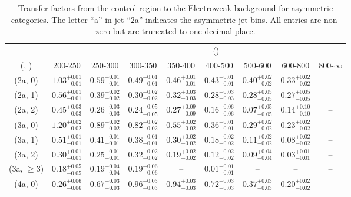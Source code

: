 \begin{table}[h!]
\tiny
\centering
\caption{Transfer factors from the \mj control region to the Electroweak background for asymmetric categories. The letter ``a'' in jet \eg ``2a''  indicates the asymmetric jet bins. All entries are non-zero but are truncated to one decimal place.\label{tab:tf_mu_total_asym}}
\begin{tabular}
{ccccccccc}
	\hline\hline
&	& \multicolumn{8}{c}{\scalht (\gev)} \\ 
	 (\njet,  \nb) & 200-250 & 250-300 & 300-350 & 350-400 & 400-500 & 500-600 & 600-800 & 800-$\infty$ \\ [0.8ex] 
\hline
	(2a, 0) & $1.03^{+ 0.01 }_{- 0.01 }$ & $0.59^{+ 0.01 }_{- 0.01 }$ & $0.49^{+ 0.01 }_{- 0.01 }$ & $0.46^{+ 0.01 }_{- 0.01 }$ & $0.43^{+ 0.01 }_{- 0.01 }$ & $0.40^{+ 0.02 }_{- 0.02 }$ & $0.33^{+ 0.02 }_{- 0.02 }$ & -- \\[0.5ex] 
	(2a, 1) & $0.56^{+ 0.01 }_{- 0.01 }$ & $0.39^{+ 0.02 }_{- 0.02 }$ & $0.30^{+ 0.02 }_{- 0.02 }$ & $0.32^{+ 0.03 }_{- 0.03 }$ & $0.28^{+ 0.03 }_{- 0.03 }$ & $0.28^{+ 0.05 }_{- 0.05 }$ & $0.27^{+ 0.05 }_{- 0.05 }$ & -- \\[0.5ex] 
	(2a, 2) & $0.45^{+ 0.03 }_{- 0.03 }$ & $0.26^{+ 0.03 }_{- 0.03 }$ & $0.24^{+ 0.05 }_{- 0.05 }$ & $0.27^{+ 0.09 }_{- 0.09 }$ & $0.16^{+ 0.06 }_{- 0.06 }$ & $0.07^{+ 0.05 }_{- 0.05 }$ & $0.14^{+ 0.10 }_{- 0.10 }$ & -- \\[0.5ex] 
	(3a, 0) & $1.20^{+ 0.02 }_{- 0.02 }$ & $0.89^{+ 0.02 }_{- 0.02 }$ & $0.82^{+ 0.02 }_{- 0.02 }$ & $0.55^{+ 0.02 }_{- 0.02 }$ & $0.36^{+ 0.01 }_{- 0.01 }$ & $0.29^{+ 0.02 }_{- 0.02 }$ & $0.23^{+ 0.02 }_{- 0.02 }$ & -- \\[0.5ex] 
	(3a, 1) & $0.51^{+ 0.01 }_{- 0.01 }$ & $0.41^{+ 0.01 }_{- 0.01 }$ & $0.38^{+ 0.01 }_{- 0.01 }$ & $0.30^{+ 0.02 }_{- 0.02 }$ & $0.18^{+ 0.02 }_{- 0.02 }$ & $0.11^{+ 0.02 }_{- 0.02 }$ & $0.08^{+ 0.02 }_{- 0.02 }$ & -- \\[0.5ex] 
	(3a, 2) & $0.30^{+ 0.01 }_{- 0.01 }$ & $0.25^{+ 0.01 }_{- 0.01 }$ & $0.32^{+ 0.02 }_{- 0.02 }$ & $0.19^{+ 0.02 }_{- 0.02 }$ & $0.12^{+ 0.02 }_{- 0.02 }$ & $0.09^{+ 0.04 }_{- 0.04 }$ & $0.03^{+ 0.01 }_{- 0.01 }$ & -- \\[0.5ex] 
	(3a, $\ge3$) & $0.18^{+ 0.05 }_{- 0.05 }$ & $0.19^{+ 0.04 }_{- 0.04 }$ & $0.19^{+ 0.06 }_{- 0.06 }$ & -- & $0.01^{+ 0.01 }_{- 0.01 }$ & -- & -- & -- \\[0.5ex] 
	(4a, 0) & $0.26^{+ 0.06 }_{- 0.06 }$ & $0.67^{+ 0.03 }_{- 0.03 }$ & $0.96^{+ 0.03 }_{- 0.03 }$ & $0.94^{+ 0.03 }_{- 0.03 }$ & $0.72^{+ 0.03 }_{- 0.03 }$ & $0.37^{+ 0.03 }_{- 0.03 }$ & $0.20^{+ 0.02 }_{- 0.02 }$ & -- \\[0.5ex] 

\end{tabular}
\end{table}

